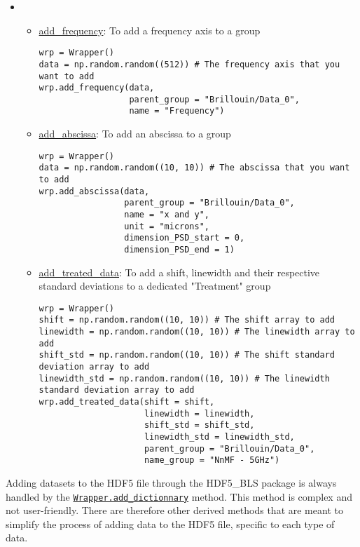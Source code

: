 \begin{tcolorbox}
\begin{itemize}
    \item[] \begin{itemize}
        \item \hyperref[subsec:wrapper.add_frequency]{add\_frequency}: To add a frequency axis to a group
\begin{lstlisting}
wrp = Wrapper()
data = np.random.random((512)) # The frequency axis that you want to add
wrp.add_frequency(data,
                  parent_group = "Brillouin/Data_0", 
                  name = "Frequency")
\end{lstlisting}
        \item \hyperref[subsec:wrapper.add_abscissa]{add\_abscissa}: To add an abscissa to a group
\begin{lstlisting}
wrp = Wrapper()
data = np.random.random((10, 10)) # The abscissa that you want to add
wrp.add_abscissa(data,
                 parent_group = "Brillouin/Data_0", 
                 name = "x and y",
                 unit = "microns",
                 dimension_PSD_start = 0,
                 dimension_PSD_end = 1)
\end{lstlisting}
        \item \hyperref[subsec:wrapper.add_treated_data]{add\_treated\_data}: To add a shift, linewidth and their respective standard deviations to a dedicated "Treatment" group
\begin{lstlisting}
wrp = Wrapper()
shift = np.random.random((10, 10)) # The shift array to add
linewidth = np.random.random((10, 10)) # The linewidth array to add
shift_std = np.random.random((10, 10)) # The shift standard deviation array to add
linewidth_std = np.random.random((10, 10)) # The linewidth standard deviation array to add
wrp.add_treated_data(shift = shift,
                     linewidth = linewidth,
                     shift_std = shift_std,
                     linewidth_std = linewidth_std,
                     parent_group = "Brillouin/Data_0", 
                     name_group = "NnMF - 5GHz")
\end{lstlisting}
    \end{itemize}
\end{itemize}
\end{tcolorbox}

Adding datasets to the HDF5 file through the HDF5\_BLS package is always handled by the \hyperref[subsec:wrapper.add_dictionnary]\texttt{Wrapper.add\_dictionnary} method. This method is complex and not user-friendly. There are therefore other derived methods that are meant to simplify the process of adding data to the HDF5 file, specific to each type of data.

